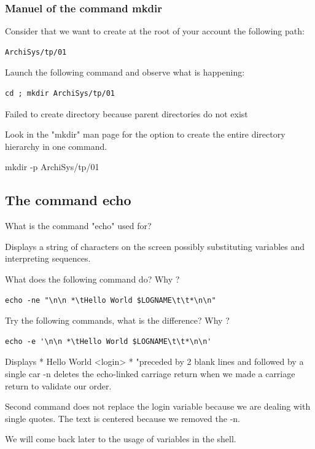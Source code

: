 \documentclass[11pt]{article}
\begin{document}
\subsubsection{Manuel of the command \textbf{mkdir}}

Consider that we want to create at the root of your account the following path:

\begin{lstlisting}
ArchiSys/tp/01
\end{lstlisting}

\noindent Launch the following command and observe what is happening:
                                                         
\begin{lstlisting}
cd ; mkdir ArchiSys/tp/01
\end{lstlisting}
\begin{solution}
Failed to create directory because parent directories do not exist
\end{solution}
\noindent Look in the "mkdir" man page for the option to create the entire directory hierarchy in one command.

\begin{solution}
mkdir -p ArchiSys/tp/01
\end{solution}

\subsection{The command echo}
\noindent
What is the command "echo" used for?

\begin{solution}
Displays a string of characters on the screen possibly substituting variables and interpreting sequences.
\end{solution}

\noindent What does the following command do? Why ?

\begin{lstlisting}[alsoletter={*},emph={*}]
echo -ne "\n\n *\tHello World $LOGNAME\t\t*\n\n"
\end{lstlisting}

\noindent Try the following commands, what is the difference? Why ?

\begin{lstlisting}[alsoletter={*},emph={*}]
echo -e '\n\n *\tHello World $LOGNAME\t\t*\n\n'
\end{lstlisting}

\begin{solution}
	Displays * Hello World <login> * "preceded by 2 blank lines and followed by a single car -n deletes the echo-linked carriage return when we made a carriage return to validate our order.
	
	Second command does not replace the login variable because we are dealing with single quotes. The text is centered because we removed the -n.
	
	We will come back later to the usage of variables in the shell.

\end{solution}
\end{document}
